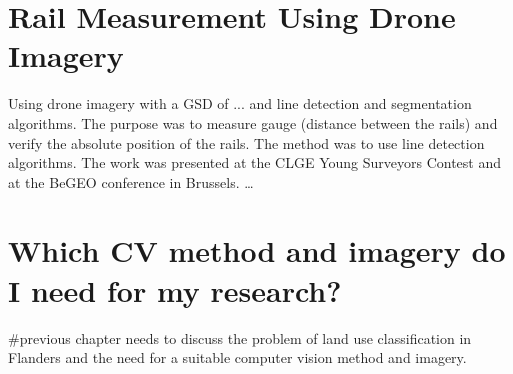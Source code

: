 \section{Rail Measurement Using Drone Imagery}
Using drone imagery with a GSD of ... and line detection and segmentation algorithms.
The purpose was to measure gauge (distance between the rails) and verify the absolute position of the rails. The method was to use line detection algorithms.  
The work was presented at the CLGE Young Surveyors Contest and at the BeGEO conference in Brussels.  
\ldots



\section{Which CV method and imagery do I need for my research?}
#previous chapter needs to discuss the problem of land use classification in Flanders and the need for a suitable computer vision method and imagery.




\cleardoublepage

